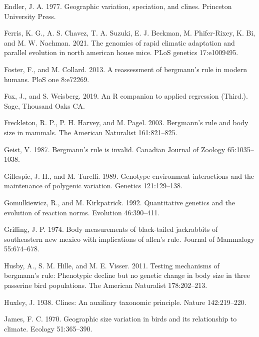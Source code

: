 \documentclass[]{article}
\begin{document}
\leavevmode\hypertarget{ref-Endler1977}{}%
Endler, J. A. 1977. Geographic variation, speciation, and clines.
Princeton University Press.

\leavevmode\hypertarget{ref-Ferris2021}{}%
Ferris, K. G., A. S. Chavez, T. A. Suzuki, E. J. Beckman, M.
Phifer-Rixey, K. Bi, and M. W. Nachman. 2021. The genomics of rapid
climatic adaptation and parallel evolution in north american house mice.
PLoS genetics 17:e1009495.

\leavevmode\hypertarget{ref-Foster2013}{}%
Foster, F., and M. Collard. 2013. A reassessment of bergmann's rule in
modern humans. PloS one 8:e72269.

\leavevmode\hypertarget{ref-Fox2019}{}%
Fox, J., and S. Weisberg. 2019. An R companion to applied regression
(Third.). Sage, Thousand Oaks CA.

\leavevmode\hypertarget{ref-Freckleton2003}{}%
Freckleton, R. P., P. H. Harvey, and M. Pagel. 2003. Bergmann's rule and
body size in mammals. The American Naturalist 161:821--825.

\leavevmode\hypertarget{ref-Geist1987}{}%
Geist, V. 1987. Bergmann's rule is invalid. Canadian Journal of Zoology
65:1035--1038.

\leavevmode\hypertarget{ref-Gillespie1989}{}%
Gillespie, J. H., and M. Turelli. 1989. Genotype-environment
interactions and the maintenance of polygenic variation. Genetics
121:129--138.

\leavevmode\hypertarget{ref-Gomulkiewicz1992}{}%
Gomulkiewicz, R., and M. Kirkpatrick. 1992. Quantitative genetics and
the evolution of reaction norms. Evolution 46:390--411.

\leavevmode\hypertarget{ref-Griffing1974}{}%
Griffing, J. P. 1974. Body measurements of black-tailed jackrabbits of
southeastern new mexico with implications of allen's rule. Journal of
Mammalogy 55:674--678.

\leavevmode\hypertarget{ref-Husby2011}{}%
Husby, A., S. M. Hille, and M. E. Visser. 2011. Testing mechanisms of
bergmann's rule: Phenotypic decline but no genetic change in body size
in three passerine bird populations. The American Naturalist
178:202--213.

\leavevmode\hypertarget{ref-Huxley1938}{}%
Huxley, J. 1938. Clines: An auxiliary taxonomic principle. Nature
142:219--220.

\leavevmode\hypertarget{ref-James1970}{}%
James, F. C. 1970. Geographic size variation in birds and its
relationship to climate. Ecology 51:365--390.
\end{document}
